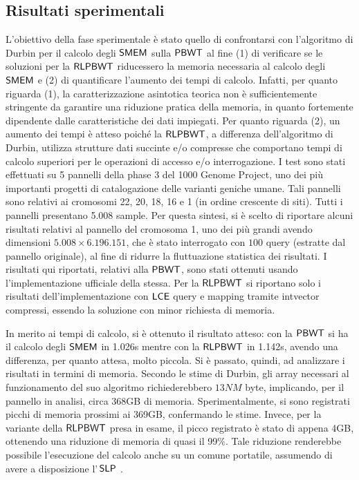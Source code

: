 \documentclass[a4paper,11pt, oneside,italian]{article}
\def\SLP{\mbox{\rm {\sf SLP}}}
\def\LCE{\mbox{\rm {\sf LCE}}}
\def\PBWT{\mbox{\rm {\sf PBWT}}}
\def\RLPBWT{\mbox{\rm {\sf RLPBWT}}}
\def\SMEM{\mbox{\rm {\sf SMEM}}}
\def\LCE{\mbox{\rm {\sf LCE}}}
\begin{document}
\subsection*{Risultati sperimentali}
L'obiettivo della fase sperimentale è stato quello di confrontarsi con
l'algoritmo di Durbin per il calcolo degli $\SMEM$ sulla $\PBWT$ al fine 
(1) di verificare se le soluzioni per la $\RLPBWT$ riducessero la memoria
necessaria al calcolo degli 
$\SMEM$ e (2) di quantificare l'aumento dei tempi di calcolo.
Infatti, per quanto riguarda (1), la caratterizzazione asintotica teorica non è
sufficientemente stringente da garantire una riduzione pratica della memoria, in
quanto fortemente dipendente dalle caratteristiche dei dati impiegati.
Per quanto riguarda (2), un aumento dei tempi è atteso poiché la $\RLPBWT$,
a differenza dell'algoritmo di Durbin, utilizza strutture dati succinte e/o
compresse che comportano tempi di calcolo superiori per le operazioni di accesso
e/o interrogazione. 
I test sono stati effettuati su 5 pannelli della phase 3 del 1000 Genome
Project, uno dei più importanti progetti di catalogazione delle varianti
geniche 
umane. Tali pannelli sono relativi ai cromosomi 22, 20, 18, 16 e 1
(in ordine crescente di siti). Tutti i pannelli presentano 5.008 sample.
Per questa sintesi, si è scelto di riportare alcuni risultati relativi al
pannello del cromosoma 1, uno dei più grandi avendo dimensioni $5.008 \times
6.196.151$, che è stato 
interrogato con $100$ query (estratte dal pannello originale), al 
fine di ridurre la fluttuazione statistica dei risultati.
I risultati qui riportati, relativi alla $\PBWT$, sono stati ottenuti usando
l'implementazione ufficiale della stessa. Per la $\RLPBWT$ si riportano solo i
risultati dell'implementazione con $\LCE$ query e mapping tramite intvector
compressi, essendo la soluzione con minor richiesta di memoria.  

In merito ai tempi di calcolo, si è ottenuto il risultato atteso: con
la $\PBWT$ si ha il calcolo degli $\SMEM$ in 1.026s
mentre con la $\RLPBWT$ in 1.142s, avendo una differenza, per quanto attesa,
molto piccola.
Si è passato, quindi, ad analizzare i risultati in termini di memoria. Secondo
le stime di Durbin, gli array necessari al funzionamento del suo algoritmo
richiederebbero $13NM$ byte, implicando, per il pannello in analisi, circa
368GB di memoria. 
Sperimentalmente, si sono registrati
picchi di memoria prossimi ai 369GB, confermando le stime. Invece,
per la variante della $\RLPBWT$ presa in esame, il picco
registrato è stato di appena 4GB, 
ottenendo una riduzione di memoria di quasi il 99\%. Tale riduzione renderebbe
possibile l'esecuzione del calcolo anche su un comune portatile, assumendo di
avere a disposizione l'$\,\SLP$ . 
\end{document}
